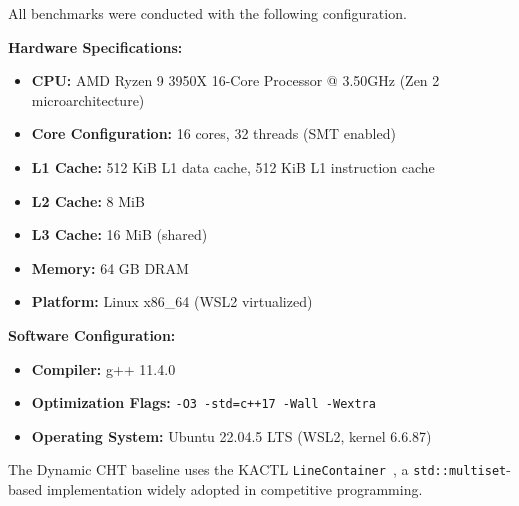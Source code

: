 \documentclass[11pt,a4paper]{article}
\theoremstyle{definition}
\theoremstyle{plain}
\begin{document}
All benchmarks were conducted with the following configuration.

\textbf{Hardware Specifications:}
\begin{itemize}
\item \textbf{CPU:} AMD Ryzen 9 3950X 16-Core Processor @ 3.50GHz (Zen 2 microarchitecture)
\item \textbf{Core Configuration:} 16 cores, 32 threads (SMT enabled)
\item \textbf{L1 Cache:} 512 KiB L1 data cache, 512 KiB L1 instruction cache
\item \textbf{L2 Cache:} 8 MiB
\item \textbf{L3 Cache:} 16 MiB (shared)
\item \textbf{Memory:} 64 GB DRAM
\item \textbf{Platform:} Linux x86\_64 (WSL2 virtualized)
\end{itemize}

\textbf{Software Configuration:}
\begin{itemize}
\item \textbf{Compiler:} g++ 11.4.0
\item \textbf{Optimization Flags:} \texttt{-O3 -std=c++17 -Wall -Wextra}
\item \textbf{Operating System:} Ubuntu 22.04.5 LTS (WSL2, kernel 6.6.87)
\end{itemize}

The Dynamic CHT baseline uses the KACTL \texttt{LineContainer}~\cite{kactl}, a \texttt{std::multiset}-based implementation widely adopted in competitive programming.
\end{document}
